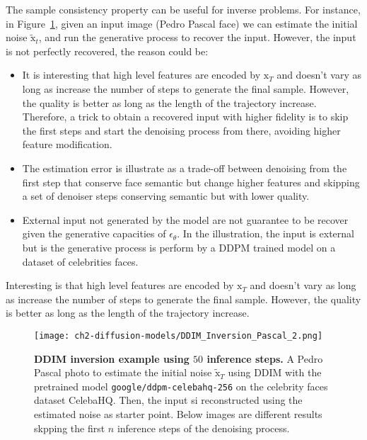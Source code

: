 \noindent The sample consistency property can be useful for inverse problems. For instance, in Figure~\ref{fig:ddim-inversion-pascal}, given an input image (Pedro Pascal face) we can estimate the initial noise $\tilde{\mathrm{x}}_{t}$, and run the generative process to recover the input. However, the input is not perfectly recovered, the reason could be:

\begin{itemize}
    \item It is interesting that high level features are encoded by $\mathrm{x}_{T}$ and doesn't vary as long as increase the number of steps to generate the final sample. However, the quality is better as long as the length of the trajectory increase. Therefore, a trick to obtain a recovered input with higher fidelity is to skip the first steps and start the denoising process from there, avoiding higher feature modification.
    \item The estimation error is illustrate as a trade-off between denoising from the first step that conserve face semantic but change higher features and skipping a set of denoiser steps conserving semantic but with lower quality.
    \item External input not generated by the model are not guarantee to be recover given the generative capacities of $\epsilon_{\theta}$. In the illustration, the input is external but is the generative process is perform by a DDPM trained model on a dataset of celebrities faces.
\end{itemize}

\noindent Interesting is that high level features are encoded by $\mathrm{x}_{T}$ and doesn't vary as long as increase the number of steps to generate the final sample. However, the quality is better as long as the length of the trajectory increase. \\

\begin{figure}[ht]
    \centering
    \texttt{[image: ch2-diffusion-models/DDIM\_Inversion\_Pascal\_2.png]}
    \captionsetup{width=\textwidth} %
    \caption{\textbf{DDIM inversion example using $50$ inference steps.} A Pedro Pascal photo to estimate the initial noise $\tilde{\mathrm{x}}_T$ using DDIM with the pretrained model \texttt{google/ddpm-celebahq-256} on the celebrity faces dataset CelebaHQ. Then, the input si reconstructed using the estimated noise as starter point. Below images are different results skpping the first $n$ inference steps of the denoising process.}
    \label{fig:ddim-inversion-pascal}
  \end{figure}

